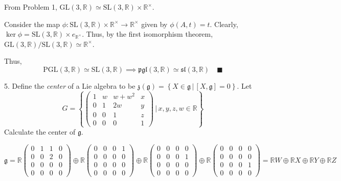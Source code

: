 \documentclass[12pt]{article}
\newcommand{\R}{\mathbb{R}}
\newcommand{\GL}{\text{GL}}
\newcommand{\SL}{\text{SL}}
\newcommand{\sll}{\mathfrak{sl}}
\newcommand{\g}{\mathfrak{g}}
\newcommand{\qed}{\quad \blacksquare}
\begin{document}
    \color{blue}
        From Problem 1, $\GL(3,\R) \simeq \SL(3,\R) \times \R^{\times}$. 
        
        Consider the map $\phi: \SL(3,\R) \times \R^{\times} \to \R^{\times}$ given by $\phi(A, t) = t$. Clearly, $\ker \phi = \SL(3, \R) \times e_{\R^{\times}}$. Thus, by the first isomorphism theorem, $\GL(3, \R)/\SL(3, \R) \simeq \R^{\times}$. 
        
        Thus, 
        \[\text{PGL}(3, \R) \simeq \SL(3, \R) \implies \mathfrak{pgl}(3, \R) \simeq \sll(3, \R) \qed\] 
                
    \color{black}

\pagebreak

5.  Define the \emph{center} of a Lie algebra to be $\mathfrak{z}(\g) = \left\{ X \in \mathfrak{g} \, | \, [X,\g] = 0 \right\}$.  Let \[
G = \left\{\left(\begin{array}{cccc}
1 & w & w+w^{2} & x\\
0 & 1 & 2w  & y\\
0 & 0 & 1  & z \\
0 & 0 & 0 & 1
\end{array}\right) \, \bigg| \, x,y,z,w \in \R\right\}
\] 
Calculate the center of $\g$. 

    \color{blue}
        \[\g = \R \begin{pmatrix}
            0 & 1 & 1 & 0\\ 
            0 & 0 & 2 & 0\\
            0 & 0 & 0 & 0\\
            0 & 0 & 0 & 0
        \end{pmatrix} \oplus \R \begin{pmatrix}
            0 & 0 & 0 & 1\\ 
            0 & 0 & 0 & 0\\
            0 & 0 & 0 & 0\\
            0 & 0 & 0 & 0
        \end{pmatrix} \oplus \R \begin{pmatrix}
            0 & 0 & 0 & 0\\ 
            0 & 0 & 0 & 1\\
            0 & 0 & 0 & 0\\
            0 & 0 & 0 & 0
        \end{pmatrix} \oplus \R \begin{pmatrix}
            0 & 0 & 0 & 0\\ 
            0 & 0 & 0 & 0\\
            0 & 0 & 0 & 1\\
            0 & 0 & 0 & 0
        \end{pmatrix} = \R W \oplus \R X \oplus \R Y \oplus \R Z\]
\end{document}
